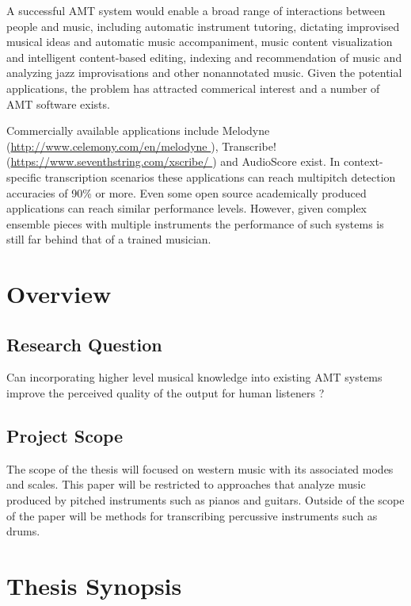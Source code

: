 A successful AMT system would enable a broad range of interactions between
people and music, including automatic instrument tutoring, dictating improvised
musical ideas and automatic music accompaniment, music content visualization and
intelligent content-based editing, indexing and recommendation of music and
analyzing jazz improvisations and other nonannotated music. Given the potential
applications, the problem has attracted commerical interest and a number of AMT
software exists. \cite{amtfc2013:Benetos}

Commercially available applications include Melodyne (\url{http://www.celemony.com/en/melodyne }), Transcribe!(\url{https://www.seventhstring.com/xscribe/ })  and AudioScore exist.
In context-specific transcription scenarios these applications can reach multipitch detection accuracies of 90\% or more. Even some open source
academically produced applications can reach similar performance levels. \cite{context-dependent2016:Cogliati}
However, given complex ensemble pieces with multiple instruments the performance of such systems
is still far behind that of a trained musician.

\section{Overview}

\subsection{Research Question}

Can incorporating higher level musical knowledge into existing AMT systems
improve the perceived quality of the output for human listeners ?

\subsection{Project Scope}

The scope of the thesis will focused on western music with its associated modes
and scales. This paper will be restricted to approaches that analyze music
produced by pitched instruments such as pianos and guitars. Outside of the scope
of the paper will be methods for transcribing percussive instruments such as
drums.

\section{Thesis Synopsis}

